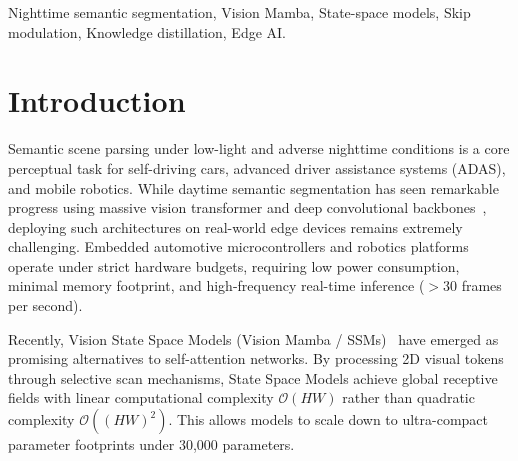 \documentclass[conference]{IEEEtran}
\begin{document}
\begin{IEEEkeywords}
Nighttime semantic segmentation, Vision Mamba, State-space models, Skip modulation, Knowledge distillation, Edge AI.
\end{IEEEkeywords}

\section{Introduction}
Semantic scene parsing under low-light and adverse nighttime conditions is a core perceptual task for self-driving cars, advanced driver assistance systems (ADAS), and mobile robotics. While daytime semantic segmentation has seen remarkable progress using massive vision transformer and deep convolutional backbones~\cite{cordts2016cityscapes}, deploying such architectures on real-world edge devices remains extremely challenging. Embedded automotive microcontrollers and robotics platforms operate under strict hardware budgets, requiring low power consumption, minimal memory footprint, and high-frequency real-time inference ($>30$ frames per second).

Recently, Vision State Space Models (Vision Mamba / SSMs)~\cite{gu2023mamba,ruan2024vmunet} have emerged as promising alternatives to self-attention networks. By processing 2D visual tokens through selective scan mechanisms, State Space Models achieve global receptive fields with linear computational complexity $\mathcal{O}(HW)$ rather than quadratic complexity $\mathcal{O}((HW)^2)$. This allows models to scale down to ultra-compact parameter footprints under 30,000 parameters.
\end{document}
